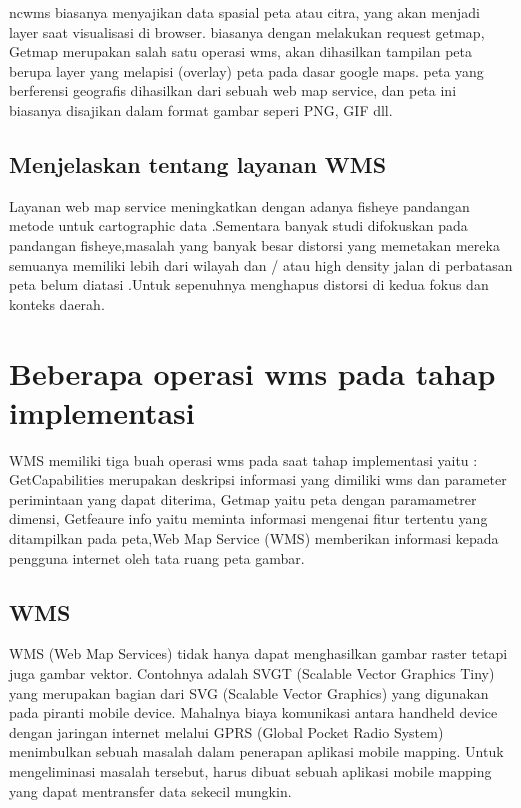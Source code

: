 ncwms biasanya menyajikan data spasial peta atau citra, yang akan menjadi layer saat visualisasi di browser.
biasanya dengan melakukan request getmap, Getmap merupakan salah satu operasi wms, akan dihasilkan tampilan peta berupa layer yang
melapisi (overlay) peta pada dasar google maps. peta yang berferensi geografis dihasilkan dari sebuah web map service, dan peta ini
biasanya disajikan dalam format gambar seperi PNG, GIF dll.

\subsection{Menjelaskan tentang layanan WMS}
Layanan web map service  meningkatkan dengan  adanya fisheye pandangan metode untuk cartographic data .Sementara banyak studi difokuskan
pada pandangan fisheye,masalah yang banyak besar distorsi yang memetakan mereka semuanya memiliki lebih dari wilayah dan / atau high
density jalan di perbatasan peta belum diatasi .Untuk sepenuhnya menghapus distorsi di kedua fokus dan konteks daerah.

\section{Beberapa operasi wms pada tahap implementasi}
WMS memiliki tiga buah operasi wms pada saat tahap implementasi yaitu : GetCapabilities merupakan deskripsi informasi yang dimiliki wms
dan parameter perimintaan yang dapat diterima, Getmap yaitu peta dengan paramametrer dimensi, Getfeaure info yaitu meminta informasi 
mengenai fitur tertentu yang ditampilkan pada peta,Web Map Service (WMS) memberikan informasi kepada pengguna internet oleh tata ruang peta gambar.

\subsection{WMS}
WMS (Web Map Services) tidak hanya dapat menghasilkan gambar raster tetapi juga gambar vektor. Contohnya  adalah SVGT (Scalable Vector
Graphics Tiny) yang merupakan bagian dari SVG (Scalable Vector Graphics) yang digunakan pada piranti mobile device. Mahalnya biaya
komunikasi antara handheld device dengan jaringan internet melalui GPRS (Global Pocket Radio System) menimbulkan sebuah masalah dalam
penerapan aplikasi mobile mapping. Untuk mengeliminasi masalah tersebut, harus dibuat sebuah aplikasi mobile mapping yang dapat mentransfer data sekecil mungkin.

